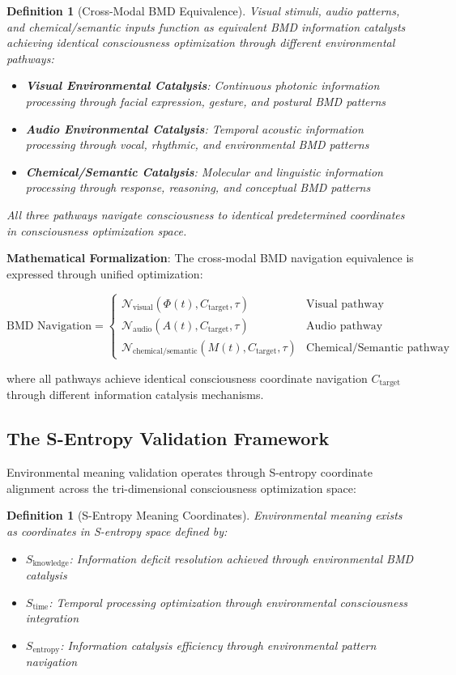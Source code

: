 \documentclass[12pt,a4paper]{article}
\newtheorem{definition}[theorem]{Definition}
\begin{document}
\begin{definition}[Cross-Modal BMD Equivalence]
Visual stimuli, audio patterns, and chemical/semantic inputs function as equivalent BMD information catalysts achieving identical consciousness optimization through different environmental pathways:
\begin{itemize}
\item \textbf{Visual Environmental Catalysis}: Continuous photonic information processing through facial expression, gesture, and postural BMD patterns
\item \textbf{Audio Environmental Catalysis}: Temporal acoustic information processing through vocal, rhythmic, and environmental BMD patterns
\item \textbf{Chemical/Semantic Catalysis}: Molecular and linguistic information processing through response, reasoning, and conceptual BMD patterns
\end{itemize}
All three pathways navigate consciousness to identical predetermined coordinates in consciousness optimization space.
\end{definition}

\textbf{Mathematical Formalization}:
The cross-modal BMD navigation equivalence is expressed through unified optimization:

$$\text{BMD Navigation} = \begin{cases} 
\mathcal{N}_{\text{visual}}(\Phi(t), C_{\text{target}}, \tau) & \text{Visual pathway} \\
\mathcal{N}_{\text{audio}}(A(t), C_{\text{target}}, \tau) & \text{Audio pathway} \\
\mathcal{N}_{\text{chemical/semantic}}(M(t), C_{\text{target}}, \tau) & \text{Chemical/Semantic pathway}
\end{cases}$$

where all pathways achieve identical consciousness coordinate navigation $C_{\text{target}}$ through different information catalysis mechanisms.

\subsection{The S-Entropy Validation Framework}

Environmental meaning validation operates through S-entropy coordinate alignment across the tri-dimensional consciousness optimization space:

\begin{definition}[S-Entropy Meaning Coordinates]
Environmental meaning exists as coordinates in S-entropy space defined by:
\begin{itemize}
\item $S_{\text{knowledge}}$: Information deficit resolution achieved through environmental BMD catalysis
\item $S_{\text{time}}$: Temporal processing optimization through environmental consciousness integration
\item $S_{\text{entropy}}$: Information catalysis efficiency through environmental pattern navigation
\end{itemize}
\end{definition}
\end{document}

